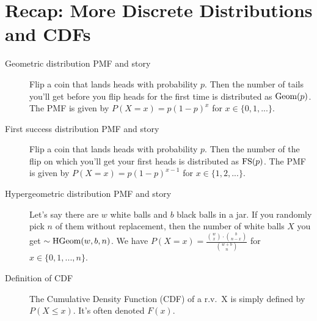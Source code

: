 \documentclass{article}
\begin{document}
 

\header


\section{Recap: More Discrete Distributions and CDFs}

\begin{description}
    \item[Geometric distribution PMF and story] Flip a coin that lands heads with probability $p$. Then the number of tails you'll get before you flip heads for the first time is distributed as $\textrm{Geom}(p)$. The PMF is given by $P(X=x) = p(1 - p)^x$ for $x \in \{0,1,...\}$.
    
    \item[First success distribution PMF and story] Flip a coin that lands heads with probability $p$. Then the number of the flip on which you'll get your first heads is distributed as $\textrm{FS}(p)$. The PMF is given by $P(X=x) = p(1-p)^{x-1}$ for $x \in \{1,2,...\}$.
    
    \item[Hypergeometric distribution PMF and story] Let's say there are $w$ white balls and $b$ black balls in a jar. If you randomly pick $n$ of them without replacement, then the number of white balls $X$ you get $\sim \textrm{HGeom}(w,b,n)$. We have $P(X=x) = \frac{\binom{w}{x} \cdot \binom{b}{n-x}}{\binom{w+b}{n}}$ for $x \in \{0,1,...,n\}$.
    
    \item[Definition of CDF] The Cumulative Density Function (CDF) of a r.v.~X is simply defined by $P(X \leq x)$. It's often denoted $F(x)$.
    
\end{description}

\end{document}
